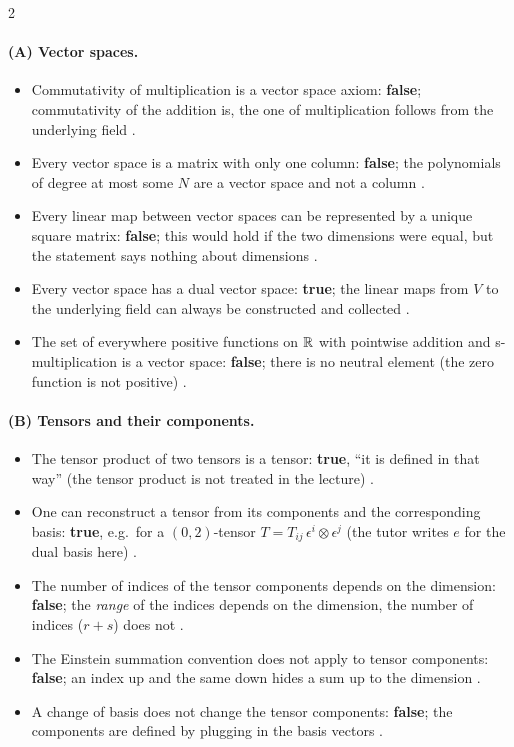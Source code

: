 \begin{paracol}{2}
\paragraph{(A) Vector spaces.}
\begin{itemize}
  \item Commutativity of multiplication is a vector space axiom: \textbf{false}; commutativity of the addition is, the one of multiplication follows from the underlying field .
  \item Every vector space is a matrix with only one column: \textbf{false}; the polynomials of degree at most some $N$ are a vector space and not a column .
  \item Every linear map between vector spaces can be represented by a unique square matrix: \textbf{false}; this would hold if the two dimensions were equal, but the statement says nothing about dimensions .
  \item Every vector space has a dual vector space: \textbf{true}; the linear maps from $V$ to the underlying field can always be constructed and collected .
  \item The set of everywhere positive functions on $\mathbb{R}$ with pointwise addition and s-multiplication is a vector space: \textbf{false}; there is no neutral element (the zero function is not positive) .
\end{itemize}

\paragraph{(B) Tensors and their components.}
\begin{itemize}
  \item The tensor product of two tensors is a tensor: \textbf{true}, ``it is defined in that way'' (the tensor product is not treated in the lecture) .
  \item One can reconstruct a tensor from its components and the corresponding basis: \textbf{true}, e.g.\ for a $(0,2)$-tensor $T=T_{ij}\,\epsilon^i\otimes\epsilon^j$ (the tutor writes $e$ for the dual basis here) .
  \item The number of indices of the tensor components depends on the dimension: \textbf{false}; the \emph{range} of the indices depends on the dimension, the number of indices ($r+s$) does not .
  \item The Einstein summation convention does not apply to tensor components: \textbf{false}; an index up and the same down hides a sum up to the dimension .
  \item A change of basis does not change the tensor components: \textbf{false}; the components are defined by plugging in the basis vectors .
\end{itemize}


\end{paracol}
